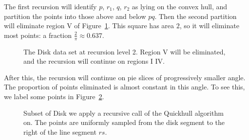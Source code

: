 The first recursion will identify $p$, $r_1$, $q$, $r_2$ as lying on the
convex hull, and partition the points into those above and below $pq$.
Then the second partition will eliminate region V of 
Figure~\ref{fig:disk_level2}. This square has area $2$, so it will eliminate
most points: a fraction $\frac{2}{\pi} \approx 0.637$.

\begin{figure}[ht]
    \caption{The Disk data set at recursion level 2. Region V will be 
             eliminated, and the recursion will continue on regions I 
             \textemdash IV.}
    \label{fig:disk_level2}
\end{figure}

After this, the recursion will continue on pie slices of progressively smaller
angle. The proportion of points eliminated is almost constant in this angle.
To see this, we label some points in Figure~\ref{fig:disk_level3+}. 

\begin{figure}[ht]
    \caption{Subset of Disk we apply a recursive call of the Quickhull 
             algorithm on. The points are uniformly sampled from the disk
             segment to the right of the line segment $rs$.}
    \label{fig:disk_level3+}
\end{figure}

